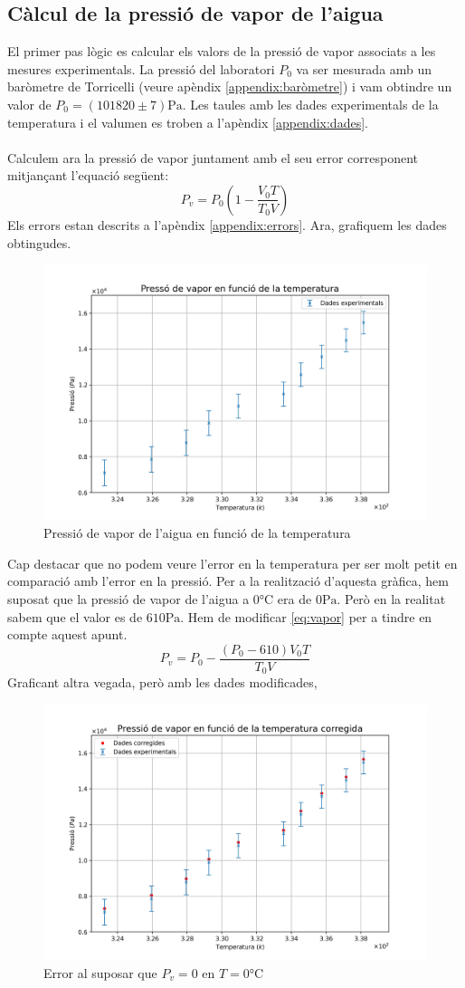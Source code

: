 \documentclass{article}
\begin{document}
    \subsection{Càlcul de la pressió de vapor de l'aigua}
        El primer pas lògic es calcular els valors de la pressió de vapor associats a les mesures experimentals. La pressió del laboratori $P_0$ va ser mesurada amb un baròmetre de Torricelli (veure apèndix \ref{appendix:baròmetre}) i vam obtindre un valor de $P_0 = (101820 \pm 7)\si{\pascal}$. Les taules amb les dades experimentals de la temperatura i el valumen es troben a l'apèndix \ref{appendix:dades}.\\ \\Calculem ara la pressió de vapor juntament amb el seu error corresponent mitjançant l'equació següent: \[P_v = P_0\left( 1-\frac{V_0T}{T_0V}\right)\]\label{eq:vapor} Els errors estan descrits a l'apèndix \ref{appendix:errors}. Ara, grafiquem les dades obtingudes.
        \begin{figure}[h]\label{fig:presio_de_vapor}
            \centering
            \includegraphics[width=.6\textwidth]{fotos/presionvapor.png}
            \caption{Pressió de vapor de l'aigua en funció de la temperatura}
        \end{figure}
        \clearpage
        Cap destacar que no podem veure l'error en la temperatura per ser molt petit en comparació amb l'error en la pressió.
        Per a la realització d'aquesta gràfica, hem suposat que la pressió de vapor de l'aigua a $0\si{\celsius}$ era de $0\si{\pascal}$. Però en la realitat sabem que el valor es de $610\si{\pascal}$. Hem de modificar \ref{eq:vapor} per a tindre en compte aquest apunt.\[P_v = P_0 - \frac{\left(P_0 - 610\right)V_0T}{T_0V}\]Graficant altra vegada, però amb les dades modificades,
        \begin{figure}[h]\label{fig:presio_de_vapor2}
            \centering
            \includegraphics[width=.75\textwidth]{fotos/presionvapor2.png}
            \caption{Error al suposar que $P_v = 0$ en $T = 0\si{\celsius}$}
        \end{figure}
\end{document}
